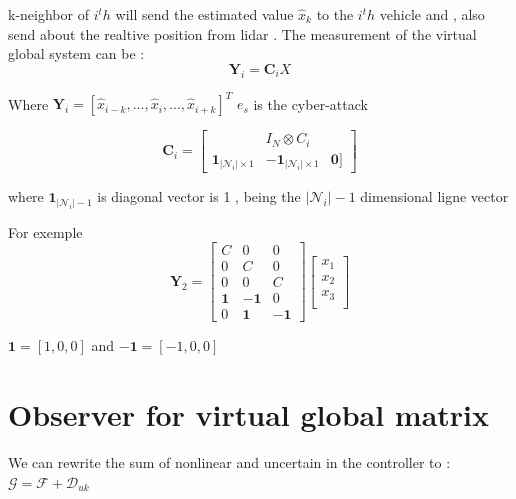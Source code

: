 \documentclass[letterpaper, 10pt, conference]{ieeeconf}  %
\begin{document}

k-neighbor of $i^th$ will send the estimated value $\hat{x}_k $ to the $i^th$ vehicle and , also send about the realtive position from lidar . The measurement of the virtual global system can be :
\begin{equation*}\label{CACC}
      \mathbf{Y}_i = \mathbf{C}_i X    
\end{equation*}  

Where $\mathbf{Y}_i = [\hat{x}_{i-k} ,..., \hat{x}_{i},..., \hat{x}_{i+k} ]^T$  
$e_s$ is the cyber-attack  

\begin{equation}
\mathbf{C}_i=\left[\begin{array}{ccc}
 & I_N \otimes C_i & \\
\mathbf{1}_{\left|\mathcal{N}_i\right| \times 1} & \mathbf{-1}_{\left|\mathcal{N}_i\right| \times 1} & \mathbf{0}]
\end{array}\right]
\end{equation}

where $\mathbf{1}_{\left|\mathcal{N}_i\right|-1 }$
is diagonal vector is 1 , being the $\left|\mathcal{N}_i\right|-1$ dimensional ligne vector 

For exemple 
\begin{equation}
    \mathbf{Y}_2 = \begin{bmatrix}
         C & 0 & 0    \\
         0 & C & 0   \\
         0 & 0 & C   \\
         \mathbf{1} & -\mathbf{1} & 0    \\
         0 & \mathbf{1} & -\mathbf{1}      
     \end{bmatrix}
     \begin{bmatrix}
     x_1 \\
    x_2 \\
    x_3 \\
    \end{bmatrix}
\end{equation}

$\mathbf{1} = [1,0,0]$ and $\mathbf{-1} = [-1,0,0]$   

\section{Observer for virtual global matrix}
We can rewrite the sum of nonlinear and uncertain in the controller to : 
    $\mathcal{G} = \mathcal{F} + \mathcal{D}_{uk}$ 
\end{document}

